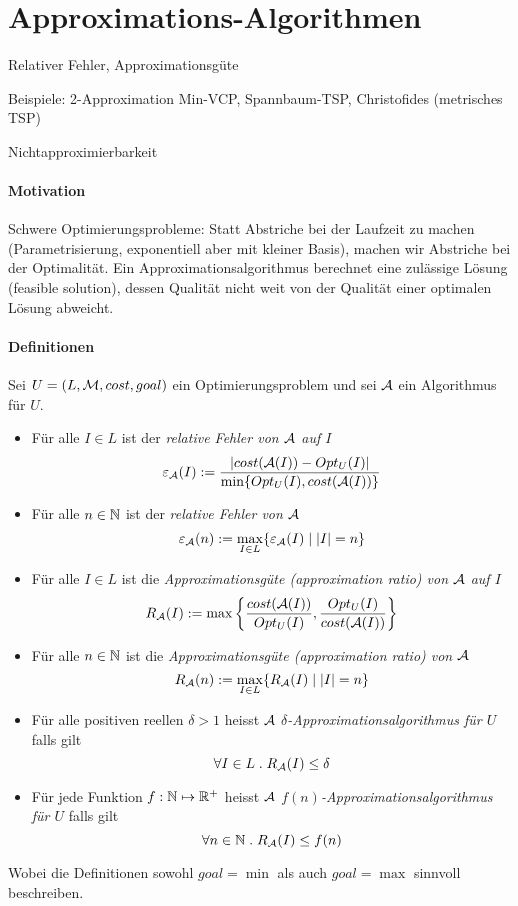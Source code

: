 \section{Approximations-Algorithmen}

\begin{takeaway}
    \item Relativer Fehler, Approximationsgüte
    \item Beispiele: 2-Approximation Min-VCP, Spannbaum-TSP, Christofides (metrisches TSP)
    \item Nichtapproximierbarkeit
\end{takeaway}

\paragraph{Motivation}
Schwere Optimierungsprobleme: Statt Abstriche bei der Laufzeit zu machen (Parametrisierung,
exponentiell aber mit kleiner Basis), machen wir Abstriche bei der Optimalität.
Ein Approximationsalgorithmus berechnet eine zulässige Lösung (feasible solution), dessen Qualität
nicht weit von der Qualität einer optimalen Lösung abweicht.

\paragraph{Definitionen}
Sei $U = (L, \mathcal{M}, cost, goal)$ ein Optimierungsproblem und sei $\mathcal{A}$ ein Algorithmus für $U$.
{
\newcommand{\opt}{Opt_U(I)}
\newcommand{\cost}{cost(\A(I))}
\begin{itemize}
    \item Für alle $I \in L$ ist der \emph{relative Fehler von $\mathcal{A}$ auf $I$}
    $$ \varepsilon_\A(I) := \frac{|\cost - \opt|}{\min \{ \opt, \cost \} } $$
    \item Für alle $n \in \mathbb{N}$ ist der \emph{relative Fehler von $\mathcal{A}$}
    $$ \varepsilon_{\mathcal{A}}(n) := \max_{I \in L} \{ \varepsilon_{\mathcal{A}}(I) \; | \; |I|=n \} $$
    \item Für alle $I \in L$ ist die \emph{Approximationsgüte (approximation ratio) von $\mathcal{A}$ auf $I$}
    $$ R_\A(I) := \max \left\{ \frac{\cost}{\opt}, \frac{\opt}{\cost} \right\} $$
    \item Für alle $n \in \mathbb{N}$ ist die \emph{Approximationsgüte (approximation ratio) von $\mathcal{A}$}
    $$ R_{\mathcal{A}}(n) := \max_{I \in L} \{ R_{\mathcal{A}}(I) \; | \; |I|=n \} $$
    \item Für alle positiven reellen $\delta > 1$ heisst $\mathcal{A}$ \emph{$\delta$-Approximationsalgorithmus für $U$} falls gilt
    $$ \forall I \in L \; . \; R_{\mathcal{A}}(I) \leq \delta $$
    \item Für jede Funktion $f : \mathbb{N} \mapsto \mathbb{R}^+$ heisst $\mathcal{A}$ \emph{$f(n)$-Approximationsalgorithmus für $U$} falls gilt
    $$ \forall n \in \mathbb{N} \; . \; R_{\mathcal{A}}(I) \leq f(n) $$
\end{itemize}
Wobei die Definitionen sowohl $goal=\min$ als auch $goal=\max$ sinnvoll beschreiben.
}


